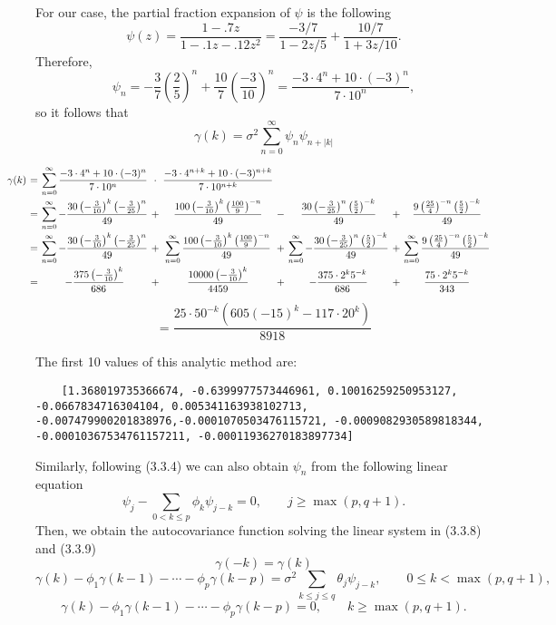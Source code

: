 For our case, the partial fraction expansion of $\psi$ is the following
\[ \psi(z) = \frac{1-.7z}{1-.1z-.12z^2} = \frac{-3/7}{1-2z/5} + \frac{10/7}{1+3z/10}. \]
Therefore, 
\[ \psi_n = -\frac{3}{7} \left( \frac{2}{5} \right)^{n} + \frac{10}{7}\left( \frac{-3}{10} \right)^n = \frac{-3\cdot 4^n + 10\cdot (-3)^n}{7\cdot 10^n}, \]
so it follows that
\[ \gamma(k) = \sigma^2 \sum_{n = 0}^{\infty} \psi_n \psi_{n+|k|}\]
\[ \hspace{-3em} \everymath{\displaystyle}
\arraycolsep=1.8pt\def\arraystretch{2.5}
\begin{array}{rccccccccc}
    \gamma(k) & = & \sum_{n = 0}^{\infty} \frac{-3\cdot 4^n + 10\cdot (-3)^n}{7\cdot 10^n}
     & \cdot & 
     \frac{-3\cdot 4^{n+k} + 10\cdot (-3)^{n+k}}{7\cdot 10^{n+k}}\\
    & = & \sum_{n = 0}^{\infty} - \frac{30 \left(- \frac{3}{10}\right)^{k} \left(- \frac{3}{25}\right)^{n}}{49} & + & \frac{100 \left(- \frac{3}{10}\right)^{k} \left(\frac{100}{9}\right)^{- n}}{49} & - & \frac{30 \left(- \frac{3}{25}\right)^{n} \left(\frac{5}{2}\right)^{- k}}{49} & + & \frac{9 \left(\frac{25}{4}\right)^{- n} \left(\frac{5}{2}\right)^{- k}}{49}\\
    & = & \sum_{n=0}^{\infty} - \frac{30 \left(- \frac{3}{10}\right)^{k} \left(- \frac{3}{25}\right)^{n}}{49} & + & \sum_{n=0}^{\infty} \frac{100 \left(- \frac{3}{10}\right)^{k} \left(\frac{100}{9}\right)^{- n}}{49} & + & \sum_{n=0}^{\infty} - \frac{30 \left(- \frac{3}{25}\right)^{n} \left(\frac{5}{2}\right)^{- k}}{49} & + & \sum_{n=0}^{\infty} \frac{9 \left(\frac{25}{4}\right)^{- n} \left(\frac{5}{2}\right)^{- k}}{49}\\
    & = & - \frac{375 \left(- \frac{3}{10}\right)^{k}}{686} & + & \frac{10000 \left(- \frac{3}{10}\right)^{k}}{4459}
    & + & - \frac{375 \cdot 2^{k} 5^{- k}}{686}
    & + & \frac{75 \cdot 2^{k} 5^{- k}}{343}
\end{array} \]
\[ = \frac{25 \cdot 50^{- k} \left(605 \left(-15\right)^{k} - 117 \cdot 20^{k}\right)}{8918} \]

The first 10 values of this analytic method are:
\begin{verbatim}
    [1.368019735366674, -0.6399977573446961, 0.10016259250953127, -0.0667834716304104, 0.005341163938102713, -0.007479900201838976,-0.0001070503476115721, -0.0009082930589818344, -0.00010367534761157211, -0.00011936270183897734]
\end{verbatim}

Similarly, following (3.3.4) we can also obtain $\psi_n$ from the following linear equation
\[ \psi_{j}-\sum_{0<k\leq p}\phi_{k}\psi_{j-k}=0,\hspace{2em}  j\geq\max(p,q+1). \]
Then, we obtain the autocovariance function solving the linear system in (3.3.8) and (3.3.9)
\[ \gamma(-k) = \gamma(k) \]
\[ \gamma( k )-\phi_{1} \gamma( k-1 )-\cdots-\phi_{p} \gamma( k-p )=\sigma^{2} \sum_{k \leq j \leq q} \theta_{j} \psi_{j-k}, \hspace{2em} 0 \leq k < \max ( p, q+1 ), \]
\[ \gamma( k )-\phi_{1} \gamma( k-1 )-\cdots-\phi_{p} \gamma( k-p )=0, \hspace{2em}  k \geq\operatorname* {m a x} ( p, q+1 ). \]

